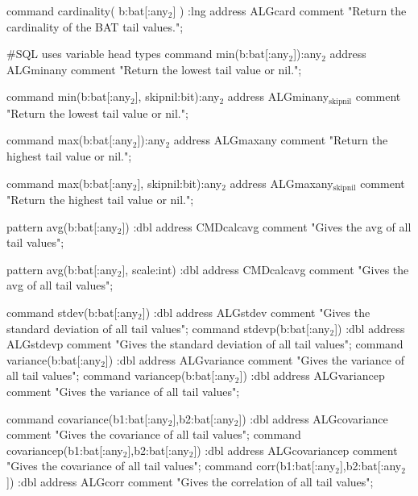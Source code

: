\documentclass[11pt]{article}
\begin{document}
command cardinality( b:bat[:any\(_{\text{2}}\)] ) :lng
address ALGcard
comment "Return the cardinality of the BAT tail values.";

\#SQL uses variable head types
command min(b:bat[:any\(_{\text{2}}\)]):any\(_{\text{2}}\)
address ALGminany
comment "Return the lowest tail value or nil.";

command min(b:bat[:any\(_{\text{2}}\)], skipnil:bit):any\(_{\text{2}}\)
address ALGminany\(_{\text{skipnil}}\)
comment "Return the lowest tail value or nil.";

command max(b:bat[:any\(_{\text{2}}\)]):any\(_{\text{2}}\)
address ALGmaxany
comment "Return the highest tail value or nil.";

command max(b:bat[:any\(_{\text{2}}\)], skipnil:bit):any\(_{\text{2}}\)
address ALGmaxany\(_{\text{skipnil}}\)
comment "Return the highest tail value or nil.";

pattern avg(b:bat[:any\(_{\text{2}}\)]) :dbl
address CMDcalcavg
comment "Gives the avg of all tail values";

pattern avg(b:bat[:any\(_{\text{2}}\)], scale:int) :dbl
address CMDcalcavg
comment "Gives the avg of all tail values";

command stdev(b:bat[:any\(_{\text{2}}\)]) :dbl
address ALGstdev
comment "Gives the standard deviation of all tail values";
command stdevp(b:bat[:any\(_{\text{2}}\)]) :dbl
address ALGstdevp
comment "Gives the standard deviation of all tail values";
command variance(b:bat[:any\(_{\text{2}}\)]) :dbl
address ALGvariance
comment "Gives the variance of all tail values";
command variancep(b:bat[:any\(_{\text{2}}\)]) :dbl
address ALGvariancep
comment "Gives the variance of all tail values";

command covariance(b1:bat[:any\(_{\text{2}}\)],b2:bat[:any\(_{\text{2}}\)]) :dbl
address ALGcovariance
comment "Gives the covariance of all tail values";
command covariancep(b1:bat[:any\(_{\text{2}}\)],b2:bat[:any\(_{\text{2}}\)]) :dbl
address ALGcovariancep
comment "Gives the covariance of all tail values";
command corr(b1:bat[:any\(_{\text{2}}\)],b2:bat[:any\(_{\text{2}}\)]) :dbl
address ALGcorr
comment "Gives the correlation of all tail values";
\end{document}
